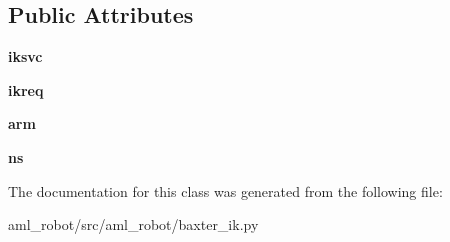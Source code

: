 \subsection*{Public Attributes}
\begin{DoxyCompactItemize}
\item 
\hypertarget{classaml__robot_1_1baxter__ik_1_1_i_k_baxter_a8febd21258f15a3721ecdddd275c9bef}{{\bfseries iksvc}}\label{classaml__robot_1_1baxter__ik_1_1_i_k_baxter_a8febd21258f15a3721ecdddd275c9bef}

\item 
\hypertarget{classaml__robot_1_1baxter__ik_1_1_i_k_baxter_ac3a37bd5bdcafced7d11cff004d5a5da}{{\bfseries ikreq}}\label{classaml__robot_1_1baxter__ik_1_1_i_k_baxter_ac3a37bd5bdcafced7d11cff004d5a5da}

\item 
\hypertarget{classaml__robot_1_1baxter__ik_1_1_i_k_baxter_a31eb6a0623788ecb628c413f6c1cf85a}{{\bfseries arm}}\label{classaml__robot_1_1baxter__ik_1_1_i_k_baxter_a31eb6a0623788ecb628c413f6c1cf85a}

\item 
\hypertarget{classaml__robot_1_1baxter__ik_1_1_i_k_baxter_a006f01e493d58ff9db613d66baa07a63}{{\bfseries ns}}\label{classaml__robot_1_1baxter__ik_1_1_i_k_baxter_a006f01e493d58ff9db613d66baa07a63}

\end{DoxyCompactItemize}


The documentation for this class was generated from the following file\-:\begin{DoxyCompactItemize}
\item 
aml\-\_\-robot/src/aml\-\_\-robot/baxter\-\_\-ik.\-py\end{DoxyCompactItemize}
